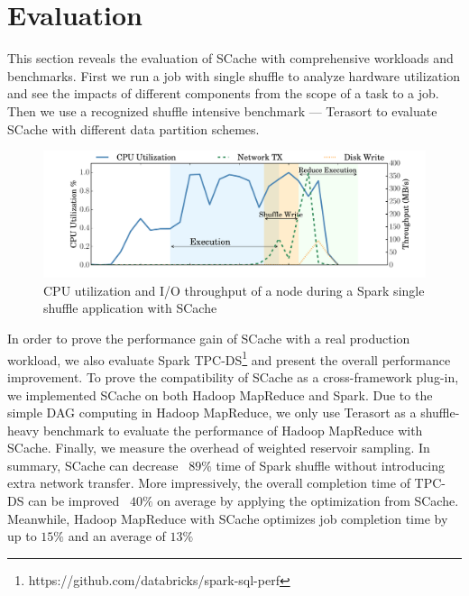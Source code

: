 \section{Evaluation}\label{evaluation}
This section reveals the evaluation of SCache with comprehensive workloads and benchmarks. 
First we run a job with single shuffle to analyze hardware utilization and see the impacts of different components from the scope of a task to a job. 
Then we use a recognized shuffle intensive benchmark --- Terasort to evaluate SCache with different data partition schemes.

\begin{figure}
	\includegraphics[width=\linewidth]{fig/scache_util}
	\caption{CPU utilization and I/O throughput of a node during a Spark single shuffle application with SCache}
	\label{fig:scache_util}
\end{figure}

In order to prove the performance gain of SCache with a real production workload, we also evaluate Spark TPC-DS\footnote{https://github.com/databricks/spark-sql-perf} and present the overall performance improvement.
{\color{black}
To prove the compatibility of SCache as a cross-framework plug-in, we implemented SCache on both Hadoop MapReduce and Spark. 
Due to the simple DAG computing in Hadoop MapReduce, we only use Terasort as a shuffle-heavy benchmark to evaluate the performance of Hadoop MapReduce with SCache.
}
Finally, we measure the overhead of weighted reservoir sampling. 
In summary, SCache can decrease ~$89\%$ time of Spark shuffle without introducing extra network transfer.
More impressively, the overall completion time of TPC-DS can be improved ~$40\%$ on average by applying the optimization from SCache.
{\color{black}Meanwhile, Hadoop MapReduce with SCache optimizes job completion time by up to $15\%$ and an average of $13\%$}


